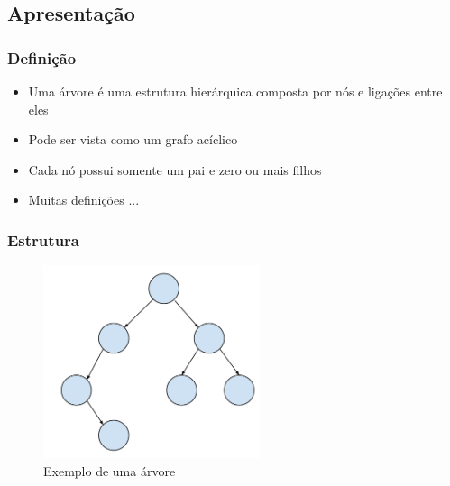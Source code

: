 \subsection{Apresentação}

\begin{frame}%

    \frametitle{Definição}
    
    \begin{itemize}
    \item Uma árvore é uma estrutura hierárquica composta por nós e ligações entre eles
    \item Pode ser vista como um grafo acíclico
    \item Cada nó possui somente um pai e zero ou mais filhos
    \item Muitas definições ...
    \end{itemize}
\end{frame}

\begin{frame}%
    \frametitle{Estrutura}
    
    \begin{figure}[tbp]
    \includegraphics[keepaspectratio=true,width=2.5in]{figs/fig_arvores/arvore.pdf}
    \centering
    \caption{Exemplo de uma árvore}
    \end{figure}
\end{frame}


